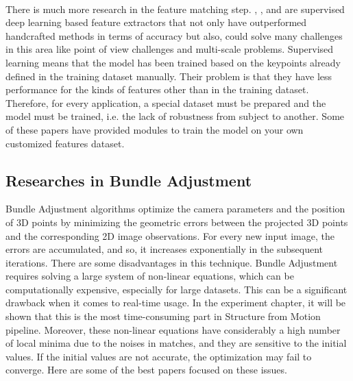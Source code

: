 \documentclass[11pt]{article}
\begin{document}
    \paragraph{} There is much more research in the feature matching step. \cite{revaud2019r2d2}, \cite{dusmanu2019d2net},
    and \cite{detone2018superpoint} are supervised deep learning based feature extractors that not only have
    outperformed handcrafted methods in terms of accuracy but also, could solve many challenges in this area like
    point of view challenges and multi-scale problems. Supervised learning means that the model has been trained
    based on the keypoints already defined in the training dataset manually. Their problem is that they have less performance for the kinds of features other
    than in the training dataset. Therefore, for every application, a special dataset must be prepared and the model
    must be trained, i.e. the lack of robustness from subject to another.
    Some of these papers have provided modules to train the model on your own customized features dataset.

    \newpage
    \subsection{Researches in Bundle Adjustment}
    Bundle Adjustment algorithms optimize the camera parameters and the position of 3D points by minimizing the
    geometric errors between the projected 3D points and the corresponding 2D image observations.
    For every new input image, the errors are accumulated, and so, it increases exponentially in the subsequent iterations.
    There are some disadvantages in this technique. Bundle Adjustment requires solving a large system of
    non-linear equations, which can be computationally expensive, especially for large datasets. This can be a
    significant drawback when it comes to real-time usage. In the experiment chapter, it will be shown that this is the most time-consuming part in Structure from Motion pipeline.
    Moreover, these non-linear equations have considerably a high number of local minima due to the noises in matches,
    and they are sensitive to the initial values. If the initial values are not accurate, the optimization may fail to converge.
    Here are some of the best papers focused on these issues.
\end{document}
